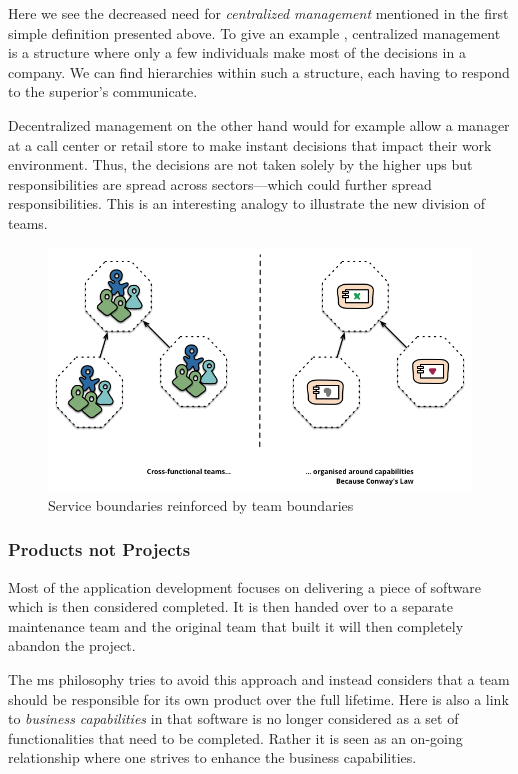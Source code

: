 Here we see the decreased need for \textit{centralized management}
mentioned in the first simple definition presented above. To give an
example \cite{central-decentral}, centralized management is a
structure where only a few individuals make most of the decisions in a
company. We can find hierarchies within such a structure, each having
to respond to the superior's communicate. 

Decentralized management on the other hand would for example allow a
manager at a call center or retail store to make instant decisions
that impact their work environment. Thus, the decisions are not taken
solely by the higher ups but responsibilities are spread across
sectors—which could further spread responsibilities. This is an
interesting analogy to illustrate the new division of teams.

\begin{figure}
	\centering
	\includegraphics[width=\linewidth]{images/PreferFunctionalStaffOrganization.png}
	\caption{Service boundaries reinforced by team boundaries \cite{ms-definition}}
	\label{fig:team-boundaries}
\end{figure}

\subsubsection{Products not Projects}

Most of the application development focuses on delivering a piece of
software which is then considered completed. It is then handed over to
a separate maintenance team and the original team that built it will
then completely abandon the project. \cite{ms-definition}

The \gls{ms} philosophy tries to avoid this approach and instead
considers that a team should be responsible for its own product over
the full lifetime. Here is also a link to \textit{business
capabilities} in that software is no longer considered as a set of
functionalities that need to be completed. Rather it is seen as an
on-going relationship where one strives to enhance the business
capabilities.  \cite{ms-definition}

